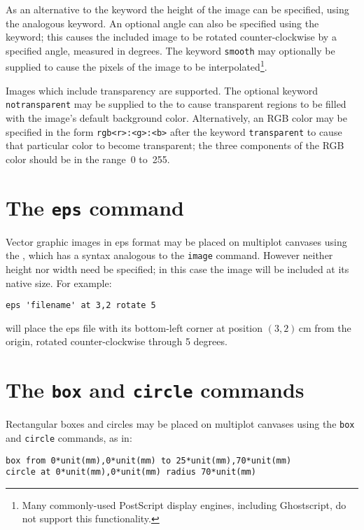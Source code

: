 As an alternative to the  keyword the height of the image can be
specified, using the analogous  keyword.  An optional angle can
also be specified using the  keyword; this causes the included
image to be rotated counter-clockwise by a specified angle, measured in
degrees.  The keyword {\tt smooth} may optionally be supplied to cause the
pixels of the image to be interpolated\footnote{Many commonly-used PostScript
display engines, including Ghostscript, do not support this functionality.}.

Images which include transparency are supported. The optional keyword {\tt
notransparent} may be supplied to the  to cause transparent
regions to be filled with the image's default background color. Alternatively,
an RGB color may be specified in the form {\tt rgb<r>:<g>:<b>} after the
keyword {\tt transparent} to cause that particular color to become
transparent; the three components of the RGB color should be in the range~0
to~255.

\section{The {\tt eps} command}

Vector graphic images in eps format may be placed on multiplot canvases
using the , which has a syntax analogous to the {\tt image}
command.  However neither height nor width need be specified; in this case the
image will be included at its native size.  For example:

\begin{verbatim}
eps 'filename' at 3,2 rotate 5
\end{verbatim}

\noindent will place the eps file with its bottom-left corner at position
$(3,2)$\,cm from the origin, rotated counter-clockwise through 5 degrees.

\section{The {\tt box} and {\tt circle} commands}
\label{sec:rectangle}

Rectangular boxes and circles may be placed on multiplot canvases
using the {\tt box} and {\tt circle} commands, as
in:

\begin{verbatim}
box from 0*unit(mm),0*unit(mm) to 25*unit(mm),70*unit(mm)
circle at 0*unit(mm),0*unit(mm) radius 70*unit(mm)
\end{verbatim}

